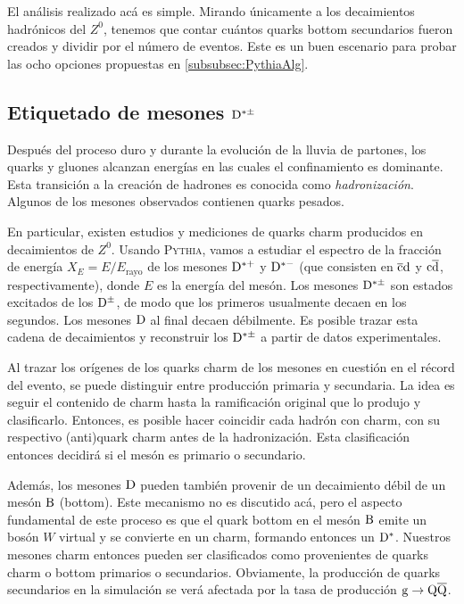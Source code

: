 El análisis realizado acá es simple. Mirando únicamente a los decaimientos hadrónicos del $Z^0$, tenemos que contar cuántos quarks bottom secundarios fueron creados y dividir por el número de eventos. Este es un buen escenario para probar las ocho opciones propuestas en \ref{subsubsec:PythiaAlg}. 

\subsection{Etiquetado de mesones ${\mathrm D}^{*\pm}$}

Después del proceso duro y durante la evolución de la lluvia de partones, los quarks y gluones alcanzan energías en las cuales el confinamiento es dominante. Esta transición a la creación de hadrones es conocida como \textit{hadronización}. Algunos de los mesones observados contienen quarks pesados.

En particular, existen estudios y mediciones de quarks charm producidos en decaimientos de $Z^0$\cite{Barate:1999bg}. Usando \textsc{Pythia}, vamos a estudiar el espectro de la fracción de energía $X_E=E/E_{\mbox{rayo}}$ de los mesones ${\mathrm D}^{*+}$ y ${\mathrm D}^{*-}$ (que consisten en $\overline{\mathrm c}{\mathrm d}$ y ${\mathrm c}\overline{\mathrm d}$, respectivamente), donde $E$ es la energía del mesón. Los mesones ${\mathrm D}^{*\pm}$ son estados excitados de los ${\mathrm D}^{\pm}$, de modo que los primeros usualmente decaen en los segundos. Los mesones ${\mathrm D}$ al final decaen débilmente. Es posible trazar esta cadena de decaimientos y reconstruir los ${\mathrm D}^{*\pm}$ a partir de datos experimentales.

Al trazar los orígenes de los quarks charm de los mesones en cuestión en el récord del evento, se puede distinguir entre producción primaria y secundaria. La idea es seguir el contenido de charm hasta la ramificación original que lo produjo y clasificarlo. Entonces, es posible hacer coincidir cada hadrón con charm, con su respectivo (anti)quark charm antes de la hadronización. Esta clasificación entonces decidirá si el mesón es primario o secundario.

Además, los mesones ${\mathrm D}$ pueden también provenir de un decaimiento débil de un mesón ${\mathrm B}$ (bottom). Este mecanismo no es discutido acá, pero el aspecto fundamental de este proceso es que el quark bottom en el mesón ${\mathrm B}$ emite un bosón $W$ virtual y se convierte en un charm, formando entonces un ${\mathrm D}^*$. Nuestros mesones charm entonces pueden ser clasificados como provenientes de quarks charm o bottom primarios o secundarios. Obviamente, la producción de quarks secundarios en la simulación se verá afectada por la tasa de producción ${\mathrm g}\to{\mathrm Q}\overline{\mathrm Q}$.

